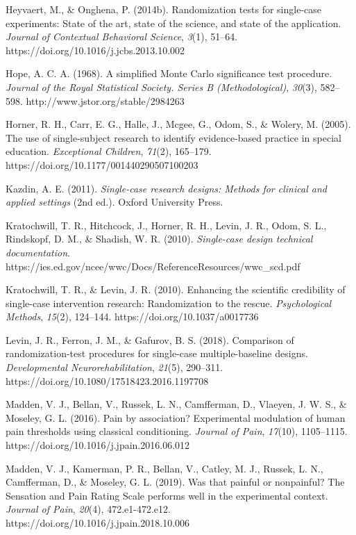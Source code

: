 \documentclass{article}
\begin{document}
Heyvaert, M., \& Onghena, P. (2014b). Randomization tests for single-case experiments: State of the art, state of the science, and state of the application. \emph{Journal of Contextual Behavioral Science}, \emph{3}(1), 51--64. https://doi.org/10.1016/j.jcbs.2013.10.002

Hope, A. C. A. (1968). A simplified Monte Carlo significance test procedure. \emph{Journal of the Royal Statistical Society. Series B (Methodological)}, \emph{30}(3), 582--598. http://www.jstor.org/stable/2984263

Horner, R. H., Carr, E. G., Halle, J., Mcgee, G., Odom, S., \& Wolery, M. (2005). The use of single-subject research to identify evidence-based practice in special education. \emph{Exceptional Children}, \emph{71}(2), 165--179. https://doi.org/10.1177/001440290507100203

Kazdin, A. E. (2011). \emph{Single-case research designs: Methods for clinical and applied settings} (2nd ed.). Oxford University Press.

Kratochwill, T. R., Hitchcock, J., Horner, R. H., Levin, J. R., Odom, S. L., Rindskopf, D. M., \& Shadish, W. R. (2010). \emph{Single-case design technical documentation}. https://ies.ed.gov/ncee/wwc/Docs/ReferenceResources/wwc\_scd.pdf

Kratochwill, T. R., \& Levin, J. R. (2010). Enhancing the scientific credibility of single-case intervention research: Randomization to the rescue. \emph{Psychological Methods}, \emph{15}(2), 124--144. https://doi.org/10.1037/a0017736

Levin, J. R., Ferron, J. M., \& Gafurov, B. S. (2018). Comparison of randomization-test procedures for single-case multiple-baseline designs. \emph{Developmental Neurorehabilitation}, \emph{21}(5), 290--311. https://doi.org/10.1080/17518423.2016.1197708

Madden, V. J., Bellan, V., Russek, L. N., Camfferman, D., Vlaeyen, J. W. S., \& Moseley, G. L. (2016). Pain by association? Experimental modulation of human pain thresholds using classical conditioning. \emph{Journal of Pain}, \emph{17}(10), 1105--1115. https://doi.org/10.1016/j.jpain.2016.06.012

Madden, V. J., Kamerman, P. R., Bellan, V., Catley, M. J., Russek, L. N., Camfferman, D., \& Moseley, G. L. (2019). Was that painful or nonpainful? The Sensation and Pain Rating Scale performs well in the experimental context. \emph{Journal of Pain}, \emph{20}(4), 472.e1-472.e12. https://doi.org/10.1016/j.jpain.2018.10.006
\end{document}

